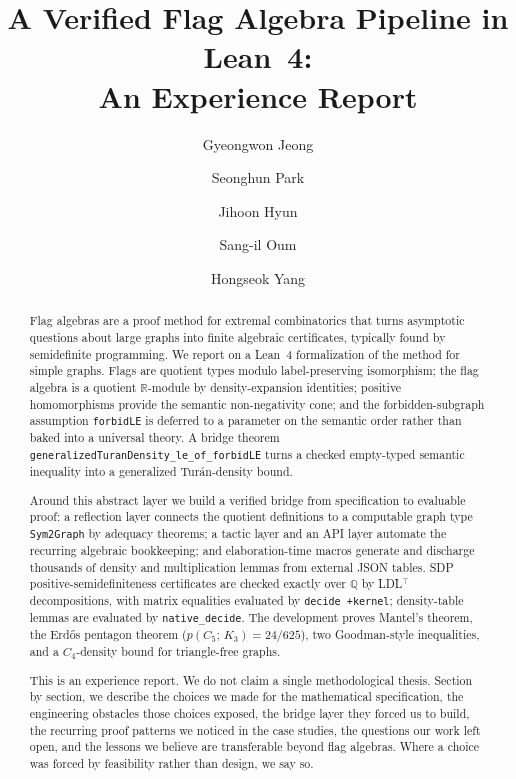 \documentclass{article}
\title{A Verified Flag Algebra Pipeline in Lean~4: \\
       An Experience Report}
\date{}
\author[1]{Gyeongwon Jeong}
\author[1]{Seonghun Park}
\author[1]{Jihoon Hyun}
\author[2]{Sang-il Oum}
\author[3]{Hongseok Yang}
\affil[1]{School of Computing, KAIST, South Korea}
\affil[2]{Discrete Mathematics Group, Institute for Basic Science (IBS), South Korea}
\affil[3]{School of Computational Sciences, Korea Institute for Advanced Study (KIAS), South Korea}
\newcommand{\tdensity}[2]{p(#1;\,#2)}
\newcommand{\lean}[1]{\texttt{#1}}
\begin{document}
\maketitle

\begin{abstract}
Flag algebras are a proof method for extremal combinatorics that turns
asymptotic questions about large graphs into finite algebraic certificates,
typically found by semidefinite programming.  We report on a Lean~4
formalization of the method for simple graphs.  Flags are quotient types
modulo label-preserving isomorphism; the flag algebra is a quotient
$\mathbb{R}$-module by density-expansion identities; positive homomorphisms
provide the semantic non-negativity cone; and the forbidden-subgraph
assumption \lean{forbidLE} is deferred to a parameter on the semantic
order rather than baked into a universal theory.  A bridge theorem
\lean{generalizedTuranDensity\_le\_of\_forbidLE} turns a checked empty-typed
semantic inequality into a generalized Tur\'an-density bound.

Around this abstract layer we build a verified bridge from specification to
evaluable proof: a reflection layer connects the quotient definitions to a
computable graph type \lean{Sym2Graph} by adequacy theorems; a tactic layer
and an API layer automate the recurring algebraic bookkeeping; and
elaboration-time macros generate and discharge thousands of density and
multiplication lemmas from external JSON tables.  SDP
positive-semidefiniteness certificates are checked exactly over $\mathbb{Q}$
by LDL$^\top$ decompositions, with matrix equalities evaluated by
\lean{decide +kernel}; density-table lemmas are evaluated by
\lean{native\_decide}.  The development proves Mantel's theorem, the Erd\H{o}s
pentagon theorem ($\tdensity{C_5}{K_3}=24/625$), two Goodman-style
inequalities, and a $C_4$-density bound for triangle-free graphs.

This is an experience report.  We do not claim a single methodological
thesis.  Section by section, we describe the choices we made for the
mathematical specification, the engineering obstacles those choices
exposed, the bridge layer they forced us to build, the recurring proof
patterns we noticed in the case studies, the questions our work left open,
and the lessons we believe are transferable beyond flag algebras.
Where a choice was forced by feasibility rather than design, we say so.
\end{abstract}

\end{document}
